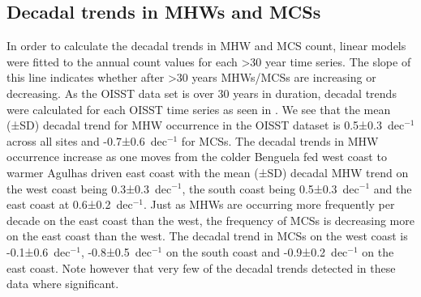 \documentclass[a4paper,10pt,review]{elsarticle}
\begin{document}
\subsection{Decadal trends in MHWs and MCSs}
In order to calculate the decadal trends in MHW and MCS count, linear models were fitted to the annual count values for each >30 year time series. The slope of this line indicates whether after >30 years MHWs/MCSs are increasing or decreasing. As the OISST data set is over 30 years in duration, decadal trends were calculated for each OISST time series as seen in . We see that the mean (±SD) decadal trend for MHW occurrence in the OISST dataset is 0.5±0.3~dec$^{-1}$ across all sites and -0.7±0.6~dec$^{-1}$ for MCSs. The decadal trends in MHW occurrence increase as one moves from the colder Benguela fed west coast to warmer Agulhas driven east coast with the mean (±SD) decadal MHW trend on the west coast being 0.3±0.3~dec$^{-1}$, the south coast being 0.5±0.3~dec$^{-1}$ and the east coast at 0.6±0.2~dec$^{-1}$. Just as MHWs are occurring more frequently per decade on the east coast than the west, the frequency of MCSs is decreasing more on the east coast than the west. The decadal trend in MCSs on the west coast is -0.1±0.6~dec$^{-1}$, -0.8±0.5~dec$^{-1}$ on the south coast and -0.9±0.2~dec$^{-1}$ on the east coast. Note however that very few of the decadal trends detected in these data where significant.
\end{document}
